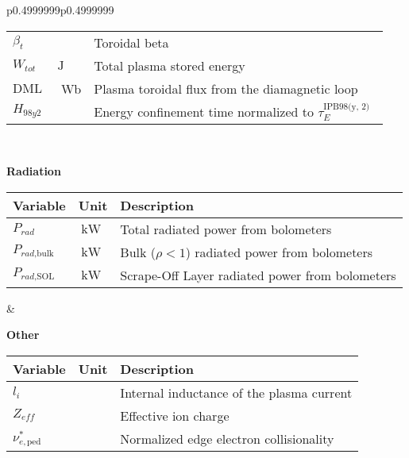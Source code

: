\begin{table*}[h]
\begin{tabular}{p{}p{}}
\begin{minipage}{0.4999999\textwidth}
\begin{tabular}{p{}p{}p{}}
$\beta_{t}$ & \hphantom{.} & Toroidal beta\\
${W}_{\textit{tot}}$ & $\SI{}{\joule}$ & Total plasma stored energy \\
$\text{DML}$ & \SI{}{\weber} & Plasma toroidal flux from the diamagnetic loop \vspace{0.01cm}\\
$H_{\textit{98y2}}$ & \hphantom{.} & Energy confinement time normalized to $\tau_{E}^{\text{IPB98(y, 2)}}$~\cite{Transport1999} \\
\bottomrule
\end{tabular}
\end{minipage}
\\
\begin{minipage}{0.4999999\textwidth}
\vspace{1.45em}\begin{center}\textbf{Radiation}\end{center}\vspace{-1.2em}
\flushleft
\begin{tabular}{p{}p{}p{}}
\toprule
Variable & Unit & Description \\
\midrule
$P_{\textit{rad}}$ & $\SI{}{\kilo\watt}$ & Total radiated power from bolometers \\
$P_{\textit{rad},\text{bulk}}$ & $\SI{}{\kilo\watt}$ & Bulk ($\rho < 1$) radiated power from bolometers \\
$P_{\textit{rad},\text{SOL}}$ & $\SI{}{\kilo\watt}$ & Scrape-Off Layer radiated power from bolometers \vspace{0.115cm}\\
\bottomrule
\end{tabular}
\end{minipage}
 &
\begin{minipage}{0.4999999\textwidth}
\centering
\vspace{1.5em}\begin{center}\textbf{Other}\end{center}\vspace{-1.2em}
\flushright
\begin{tabular}{p{}p{}p{}}
\toprule
Variable & Unit & Description \\
\midrule
$l_i$ & \hphantom{.} & Internal inductance of the plasma current \\
$Z_{\textit{eff}}$ & \hphantom{.} & Effective ion charge \\
$\nu_{e,\text{ped}}^{*}$ & \hphantom{.} & Normalized edge electron collisionality~\cite{labit2021iaea} \\

\end{tabular}
\end{minipage}
\end{tabular}
\end{table*}

